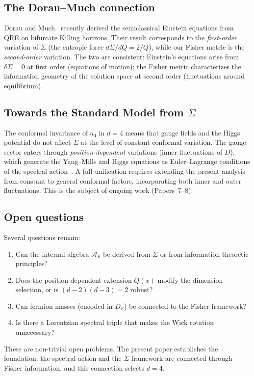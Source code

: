 \documentclass[prd,twocolumn,superscriptaddress,longbibliography]{revtex4-2}
\newcommand{\AF}{\mathcal{A}_F}
\begin{document}
\subsection{The Dorau--Much connection}

Dorau and Much~\cite{DorauMuch2025} recently derived the
semiclassical Einstein equations from QRE on bifurcate
Killing horizons.
Their result corresponds to the \emph{first-order} variation
of $\Sigma$ (the entropic force $d\Sigma/dQ = 2/Q$), while
our Fisher metric is the \emph{second-order} variation.
The two are consistent: Einstein's equations arise from
$\delta\Sigma = 0$ at first order (equations of motion);
the Fisher metric characterizes the information geometry
of the solution space at second order (fluctuations around
equilibrium).

\subsection{Towards the Standard Model from $\Sigma$}

The conformal invariance of $a_4$ in $d=4$ means that gauge
fields and the Higgs potential do not affect $\Sigma$ at the
level of constant conformal variation.
The gauge sector enters through \emph{position-dependent}
variations (inner fluctuations of $D$), which generate the
Yang--Mills and Higgs equations as Euler--Lagrange conditions
of the spectral action~\cite{CC1997,vS2024}.
A full unification requires extending the present analysis
from constant to general conformal factors, incorporating
both inner and outer fluctuations.
This is the subject of ongoing work (Papers~7--8).

\subsection{Open questions}

Several questions remain:
\begin{enumerate}
\item Can the internal algebra $\AF$ be derived from
  $\Sigma$ or from information-theoretic principles?
\item Does the position-dependent extension $Q(x)$ modify
  the dimension selection, or is $(d-2)(d-3)=2$ robust?
\item Can fermion masses (encoded in $D_F$) be connected
  to the Fisher framework?
\item Is there a Lorentzian spectral triple that makes the
  Wick rotation unnecessary?
\end{enumerate}
These are non-trivial open problems.
The present paper establishes the foundation: the spectral
action and the $\Sigma$ framework are connected through
Fisher information, and this connection selects $d=4$.
\end{document}
